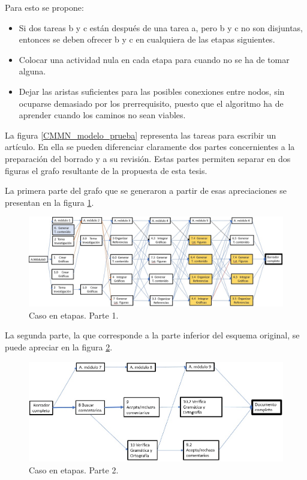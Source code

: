 Para esto se propone:

\begin{itemize}
    \item Si dos tareas b y c están después de una tarea a, pero b y c no son disjuntas, entonces se deben ofrecer b y c en cualquiera de las etapas siguientes.
    \item Colocar una actividad nula en cada etapa para cuando no se ha de tomar alguna.
    \item Dejar las aristas suficientes para las posibles conexiones entre nodos, sin ocuparse demasiado por los prerrequisito, puesto que el algoritmo ha de aprender cuando los caminos no sean viables.
\end{itemize}


La figura \ref{CMMN_modelo_prueba} representa las tareas para escribir un artículo. En ella se pueden diferenciar claramente dos partes concernientes a la preparación del borrado y a su revisión. Estas partes permiten separar en dos figuras el grafo resultante de la propuesta de esta tesis.

La primera parte del grafo que se generaron a partir de esas apreciaciones se presentan en la figura \ref{CMMN_modelo1}. 

\begin{figure}[h]
  \centering
    \includegraphics[scale=0.4]{DeCMMN1.jpg}
  \caption{Caso en etapas. Parte 1.}
  \label{CMMN_modelo1}
\end{figure}

La segunda parte, la que corresponde a la parte inferior del esquema original, se puede apreciar en la figura \ref{CMMN_modelo2}.

\begin{figure}[h]
  \centering
    \includegraphics[scale=0.55]{DeCMMN2.jpg}
  \caption{Caso en etapas. Parte 2.}
  \label{CMMN_modelo2}
\end{figure}



